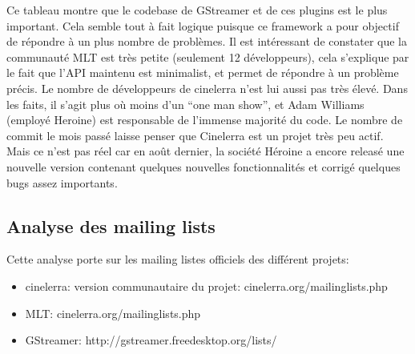 Ce tableau montre que le codebase  de GStreamer et de ces plugins est
le plus important. Cela semble tout à fait logique puisque ce framework
a pour objectif de répondre à un plus nombre de problèmes. Il est
intéressant de constater que la communauté MLT est très
petite (seulement 12 développeurs), cela s'explique par le fait que
l'API maintenu est minimalist, et permet de répondre à un problème
précis.  Le nombre de développeurs de cinelerra n'est lui aussi pas
très élevé. Dans les faits, il s'agit plus où moins d'un ``one man
show'', et Adam Williams (employé Heroine) est responsable de l'immense
majorité du code. Le nombre de commit le mois passé laisse penser que
Cinelerra est un projet très peu actif. Mais ce n'est pas réel car
en août dernier, la société Héroine a encore releasé une nouvelle
version contenant quelques nouvelles fonctionnalités et corrigé quelques
bugs assez importants.

\subsection {Analyse des mailing lists}

Cette analyse porte sur les mailing listes officiels des différent
projets:

\begin{itemize}

  \item {cinelerra: version communautaire du projet:
    cinelerra.org/mailinglists.php}

  \item {MLT: cinelerra.org/mailinglists.php}

  \item {GStreamer: http://gstreamer.freedesktop.org/lists/}

\end{itemize}


